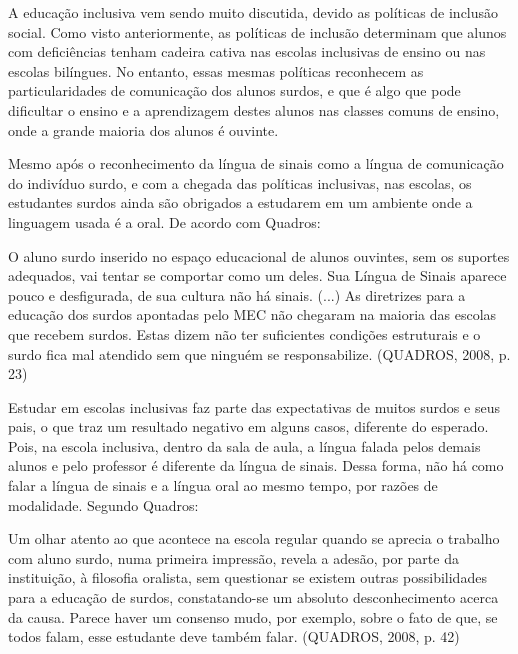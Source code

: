 \documentclass[brasil]{abnt}
\begin{document}
	A educação inclusiva vem sendo muito discutida, devido as políticas de inclusão social. Como visto anteriormente, as políticas de inclusão determinam que alunos com deficiências tenham cadeira cativa 
	nas escolas inclusivas de ensino ou nas escolas bilíngues. No entanto, essas mesmas políticas reconhecem as particularidades de comunicação dos alunos surdos, e que é algo que pode dificultar o ensino e 
	a aprendizagem destes alunos nas classes comuns de ensino, onde a grande maioria dos alunos é ouvinte.
	
	Mesmo após o reconhecimento da língua de sinais como a língua de comunicação do 
	indivíduo surdo, e com a chegada das políticas inclusivas, nas escolas, os estudantes surdos ainda são obrigados a estudarem em um ambiente onde a linguagem usada é a oral. De acordo com Quadros:
					
		\begin{citacao}O aluno surdo inserido no espaço educacional de alunos ouvintes, sem os suportes adequados, vai tentar se comportar como um deles. Sua Língua de Sinais aparece pouco e desfigurada, 
						de sua cultura não há sinais. (...) As diretrizes para a educação dos surdos apontadas pelo MEC não chegaram na maioria das escolas que recebem surdos. Estas dizem não ter suficientes 
						condições estruturais e o surdo fica mal atendido sem que ninguém se responsabilize. (QUADROS, 2008, p. 23)
		\end{citacao}
		
	Estudar em escolas inclusivas faz parte das expectativas de muitos surdos e seus pais, o que traz um resultado negativo em alguns casos, diferente do esperado.
	Pois, na escola inclusiva, dentro da sala de aula, a língua falada pelos demais alunos e pelo professor é diferente da língua de sinais. Dessa forma, não há como falar
	a língua de sinais e a língua oral ao mesmo tempo, por razões de modalidade. Segundo Quadros:
	
		\begin{citacao} Um olhar atento ao que acontece na escola regular quando se aprecia o trabalho com aluno surdo, numa primeira impressão, revela a adesão, por parte
						da instituição, à filosofia oralista, sem questionar se existem outras possibilidades para a educação de surdos, constatando-se um absoluto 
						desconhecimento acerca da causa. Parece haver um consenso mudo, por exemplo, sobre o fato de que, se todos falam, esse estudante deve também falar.
						(QUADROS, 2008, p. 42)
		\end{citacao}
	
\end{document}
